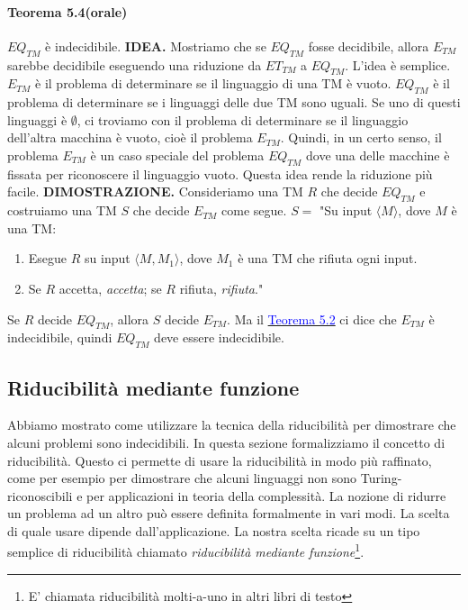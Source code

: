 \documentclass{article}
\begin{document}
\paragraph{Teorema 5.4(orale)}
\label{teorema-5.4}
\text{}
\newline
$EQ_{TM}$ è indecidibile.
\vspace{1em}
\text{}
\newline
\hbox{\textbf{IDEA.}}
Mostriamo che se $EQ_{TM}$ fosse decidibile, allora $E_{TM}$ sarebbe decidibile eseguendo una riduzione da $ET_{TM}$ a $EQ_{TM}$.
L'idea è semplice.
$E_{TM}$ è il problema di determinare se il linguaggio di una TM è vuoto.
$EQ_{TM}$ è il problema di determinare se i linguaggi delle due TM sono uguali.
Se uno di questi linguaggi è $\emptyset$, ci troviamo con il problema di determinare se il linguaggio dell'altra macchina è vuoto, cioè il problema $E_{TM}$.
Quindi, in un certo senso, il problema $E_{TM}$ è un caso speciale del problema $EQ_{TM}$ dove una delle macchine è fissata per riconoscere il linguaggio vuoto.
Questa idea rende la riduzione più facile.
\vspace{1em}
\text{}
\newline
\hbox{\textbf{DIMOSTRAZIONE.}}
Consideriamo una TM $R$ che decide $EQ_{TM}$ e costruiamo una TM $S$ che decide $E_{TM}$ come segue.
\vspace{1em}
\text{}
\newline
$S = $ "Su input $\langle M \rangle$, dove $M$ è una TM:
\begin{enumerate}
    \item Esegue $R$ su input $\langle M,M_1 \rangle$, dove $M_1$ è una TM che rifiuta ogni input.
    \item Se $R$ accetta, \textit{accetta}; se $R$ rifiuta, \textit{rifiuta}."
\end{enumerate}
\vspace{1em}
\text{}
\newline
Se $R$ decide $EQ_{TM}$, allora $S$ decide $E_{TM}$. Ma il \hyperref[teorema-5.2]{\textcolor{blue}{Teorema 5.2}} ci dice che $E_{TM}$ è indecidibile, quindi $EQ_{TM}$ deve essere indecidibile.

\subsection{Riducibilità mediante funzione}
Abbiamo mostrato come utilizzare la tecnica della riducibilità per dimostrare che alcuni problemi sono indecidibili.
In questa sezione formalizziamo il concetto di riducibilità.
Questo ci permette di usare la riducibilità in modo più raffinato, come per esempio per dimostrare che alcuni linguaggi non sono Turing-riconoscibili e per applicazioni in teoria della complessità.
La nozione di ridurre un problema ad un altro può essere definita formalmente in vari modi.
La scelta di quale usare dipende dall'applicazione. La nostra scelta ricade su un tipo semplice di riducibilità chiamato \textit{riducibilità mediante funzione}\footnote{E' chiamata riducibilità molti-a-uno in altri libri di testo}.
\end{document}
